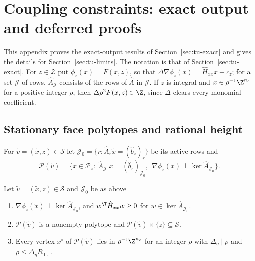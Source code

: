 \section{Coupling constraints: exact output and deferred proofs}\label{app:tu}

This appendix proves the exact-output results of Section~\ref{sec:tu-exact}
and gives the details for Section~\ref{sec:tu-limits}. The notation is that of
Section~\ref{sec:tu-exact}. For $z\in\mathcal Z$ put $\phi_z(x)=F(x,z)$, so that
$\Delta\nabla\phi_z(x)=\hat H_{xx}x+c_z$; for a set $\mathcal J$ of rows,
$\hat A_{\mathcal J}$ consists of the rows of $\hat A$ in $\mathcal J$. If $z$
is integral and $x\in\rho^{-1}\Z^{n_c}$ for a positive integer $\rho$, then
$\Delta\rho^2F(x,z)\in\Z$, since $\Delta$ clears every monomial coefficient.

\subsection{Stationary face polytopes and rational height}\label{app:tu-height}

\begin{definition}\label{def:tu-statpoly}
For $\tilde v=(\tilde x,z)\in\mathcal S$ let
$\mathcal J_0=\{r:\hat A_r\tilde x=(\hat b_z)_r\}$ be its active rows and
\[
\mathcal P(\tilde v)=\bigl\{x\in\mathcal P_z:\
\hat A_{\mathcal J_0}x=(\hat b_z)_{\mathcal J_0},\ \
\nabla\phi_z(x)\perp\ker\hat A_{\mathcal J_0}\bigr\}.
\]
\end{definition}

\begin{lemma}\label{lem:tu-statpoly}
Let $\tilde v=(\tilde x,z)\in\mathcal S$ and $\mathcal J_0$ be as above.
\begin{enumerate}[label=(\alph*)]
\item $\nabla\phi_z(\tilde x)\perp\ker\hat A_{\mathcal J_0}$, and
$w^{\T}\hat H_{xx}w\ge0$ for $w\in\ker\hat A_{\mathcal J_0}$.
\item $\mathcal P(\tilde v)$ is a nonempty polytope and
$\mathcal P(\tilde v)\times\{z\}\subseteq\mathcal S$.
\item Every vertex $x^\circ$ of $\mathcal P(\tilde v)$ lies in
$\rho^{-1}\Z^{n_c}$ for an integer $\rho$ with $\Delta_\eta\mid\rho$ and
$\rho\le\Delta_\eta R_{\mathrm{TU}}$.
\end{enumerate}
\end{lemma}

